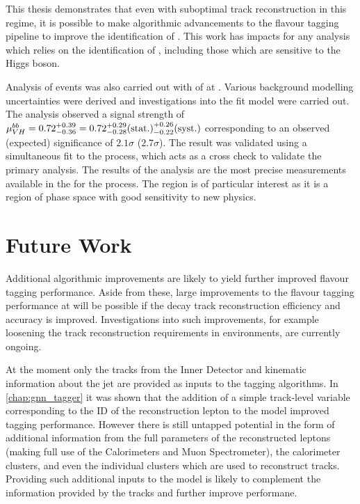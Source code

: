 This thesis demonstrates that even with suboptimal track reconstruction in this regime, it is possible to make algorithmic advancements to the flavour tagging pipeline to improve the identification of \bjets.
This work has impacts for any analysis which relies on the identification of \bjets, including those which are sensitive to the Higgs boson.

Analysis of \VHbb events was also carried out with \intlumi of \runtwo \ATLAS at .
Various background modelling uncertainties were derived and investigations into the fit model were carried out.
The analysis observed a signal strength of 
$\mu_{VH}^{bb} = 0.72 ^{+0.39}_{-0.36} = 0.72 ^{+0.29}_{-0.28} \mathrm{(stat.)} ^{+0.26}_{-0.22} \mathrm{(syst.)}$
corresponding to an observed (expected) significance of $2.1\sigma$ ($2.7\sigma$).
The result was validated using a simultaneous fit to the \VZbb process, which acts as a cross check to validate the primary analysis.
The results of the analysis are the most precise measurements available in the \highpt for the \VHbb process.
The \highpt region is of particular interest as it is a region of phase space with good sensitivity to new physics.


\section{Future Work}\label{sec:conc-future}

Additional algorithmic improvements are likely to yield further improved flavour tagging performance.
Aside from these, large improvements to the flavour tagging performance at \highpt will be possible if the \bhadron decay track reconstruction efficiency and accuracy is improved.
Investigations into such improvements, for example loosening the track reconstruction requirements in \highpt environments, are currently ongoing.

At the moment only the tracks from the Inner Detector and kinematic information about the jet are provided as inputs to the tagging algorithms.
In \cref{chap:gnn_tagger} it was shown that the addition of a simple track-level variable corresponding to the ID of the reconstruction lepton to the model improved tagging performance.
However there is still untapped potential in the form of additional information from the full parameters of the reconstructed leptons (making full use of the Calorimeters and Muon Spectrometer), the calorimeter clusters, and even the individual clusters which are used to reconstruct tracks.
Providing such additional inputs to the model is likely to complement the information provided by the tracks and further improve performane.

